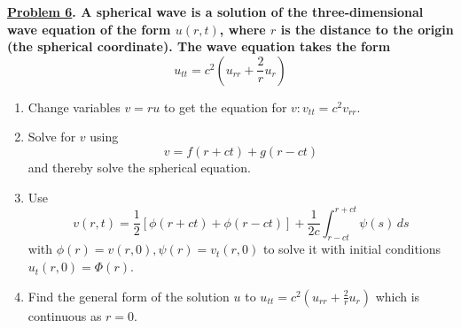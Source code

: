 \documentclass{article}
\theoremstyle{definition}
\newenvironment{boldenv}{\bfseries\boldmath}{}
\begin{document}
\begin{boldenv}
    \underline{Problem 6}. A spherical wave is a solution of the three-dimensional wave equation of the form $u(r,t)$, where $r$ is the distance to the origin (the spherical coordinate). The wave equation takes the form
    \[u_{tt}=c^2\left(u_{rr} + \frac{2}{r}u_r\right)\] \begin{enumerate}
        \item Change variables $v = ru$ to get the equation for $v: v_{tt} = c^2v_{rr}$.
        \item Solve for $v$ using
        \[v = f(r+ct) + g(r-ct)\]
        and thereby solve the spherical equation.
        \item Use
        \[v(r,t) = \frac{1}{2}[\phi(r+ct)+\phi(r-ct)] + \frac{1}{2c}\int_{r-ct}^{r+ct}\psi(s)\,ds\]
        with $\phi(r)=v(r,0), \psi(r)=v_t(r,0)$ to solve it with initial conditions $u_t(r,0)=\Phi(r)$.
        \item Find the general form of the solution $u$ to $u_{tt}=c^2\left(u_{rr} + \frac{2}{r}u_r\right)$ which is continuous as $r=0$.
    \end{enumerate}
\end{boldenv}
\end{document}
